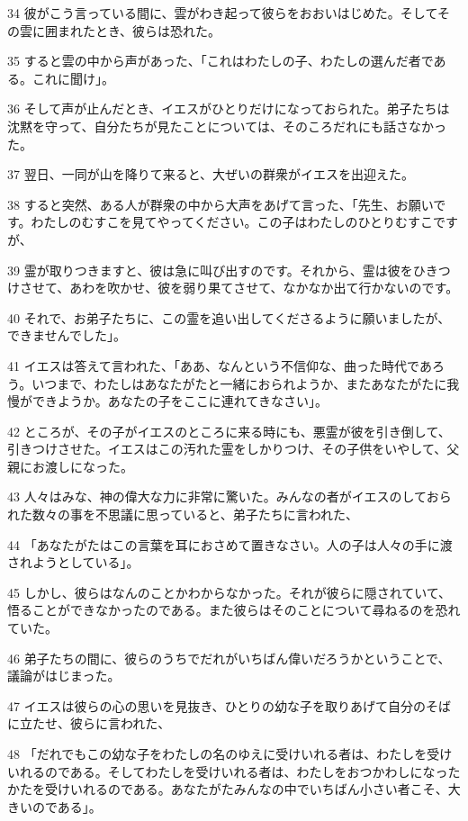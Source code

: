 \par 34 彼がこう言っている間に、雲がわき起って彼らをおおいはじめた。そしてその雲に囲まれたとき、彼らは恐れた。
\par 35 すると雲の中から声があった、「これはわたしの子、わたしの選んだ者である。これに聞け」。
\par 36 そして声が止んだとき、イエスがひとりだけになっておられた。弟子たちは沈黙を守って、自分たちが見たことについては、そのころだれにも話さなかった。
\par 37 翌日、一同が山を降りて来ると、大ぜいの群衆がイエスを出迎えた。
\par 38 すると突然、ある人が群衆の中から大声をあげて言った、「先生、お願いです。わたしのむすこを見てやってください。この子はわたしのひとりむすこですが、
\par 39 霊が取りつきますと、彼は急に叫び出すのです。それから、霊は彼をひきつけさせて、あわを吹かせ、彼を弱り果てさせて、なかなか出て行かないのです。
\par 40 それで、お弟子たちに、この霊を追い出してくださるように願いましたが、できませんでした」。
\par 41 イエスは答えて言われた、「ああ、なんという不信仰な、曲った時代であろう。いつまで、わたしはあなたがたと一緒におられようか、またあなたがたに我慢ができようか。あなたの子をここに連れてきなさい」。
\par 42 ところが、その子がイエスのところに来る時にも、悪霊が彼を引き倒して、引きつけさせた。イエスはこの汚れた霊をしかりつけ、その子供をいやして、父親にお渡しになった。
\par 43 人々はみな、神の偉大な力に非常に驚いた。みんなの者がイエスのしておられた数々の事を不思議に思っていると、弟子たちに言われた、
\par 44 「あなたがたはこの言葉を耳におさめて置きなさい。人の子は人々の手に渡されようとしている」。
\par 45 しかし、彼らはなんのことかわからなかった。それが彼らに隠されていて、悟ることができなかったのである。また彼らはそのことについて尋ねるのを恐れていた。
\par 46 弟子たちの間に、彼らのうちでだれがいちばん偉いだろうかということで、議論がはじまった。
\par 47 イエスは彼らの心の思いを見抜き、ひとりの幼な子を取りあげて自分のそばに立たせ、彼らに言われた、
\par 48 「だれでもこの幼な子をわたしの名のゆえに受けいれる者は、わたしを受けいれるのである。そしてわたしを受けいれる者は、わたしをおつかわしになったかたを受けいれるのである。あなたがたみんなの中でいちばん小さい者こそ、大きいのである」。
